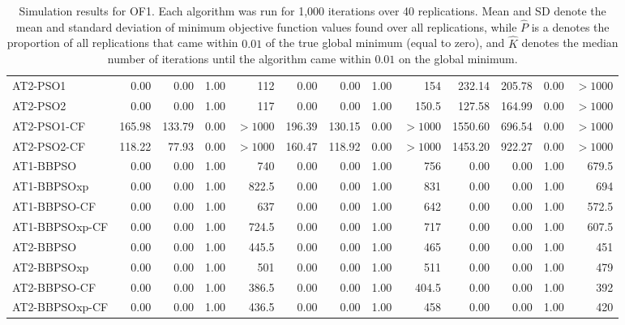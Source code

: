 \documentclass[cmbright]{staauth}
\numberwithin{table}{section}
\begin{document}
\begin{table}[ht]
\begin{tabular}{l|rrrr|rrrr|rrrr}
   \hline
AT2-PSO1 & 0.00 & 0.00 & 1.00 & 112 & 0.00 & 0.00 & 1.00 & 154 & 232.14 & 205.78 & 0.00 & $> 1000$ \\
  AT2-PSO2 & 0.00 & 0.00 & 1.00 & 117 & 0.00 & 0.00 & 1.00 & 150.5 & 127.58 & 164.99 & 0.00 & $> 1000$ \\
  AT2-PSO1-CF & 165.98 & 133.79 & 0.00 & $> 1000$ & 196.39 & 130.15 & 0.00 & $> 1000$ & 1550.60 & 696.54 & 0.00 & $> 1000$ \\
  AT2-PSO2-CF & 118.22 & 77.93 & 0.00 & $> 1000$ & 160.47 & 118.92 & 0.00 & $> 1000$ & 1453.20 & 922.27 & 0.00 & $> 1000$ \\
   \hline
AT1-BBPSO & 0.00 & 0.00 & 1.00 & 740 & 0.00 & 0.00 & 1.00 & 756 & 0.00 & 0.00 & 1.00 & 679.5 \\
  AT1-BBPSOxp & 0.00 & 0.00 & 1.00 & 822.5 & 0.00 & 0.00 & 1.00 & 831 & 0.00 & 0.00 & 1.00 & 694 \\
  AT1-BBPSO-CF & 0.00 & 0.00 & 1.00 & 637 & 0.00 & 0.00 & 1.00 & 642 & 0.00 & 0.00 & 1.00 & 572.5 \\
  AT1-BBPSOxp-CF & 0.00 & 0.00 & 1.00 & 724.5 & 0.00 & 0.00 & 1.00 & 717 & 0.00 & 0.00 & 1.00 & 607.5 \\
   \hline
AT2-BBPSO & 0.00 & 0.00 & 1.00 & 445.5 & 0.00 & 0.00 & 1.00 & 465 & 0.00 & 0.00 & 1.00 & 451 \\
  AT2-BBPSOxp & 0.00 & 0.00 & 1.00 & 501 & 0.00 & 0.00 & 1.00 & 511 & 0.00 & 0.00 & 1.00 & 479 \\
  AT2-BBPSO-CF & 0.00 & 0.00 & 1.00 & 386.5 & 0.00 & 0.00 & 1.00 & 404.5 & 0.00 & 0.00 & 1.00 & 392 \\
  AT2-BBPSOxp-CF & 0.00 & 0.00 & 1.00 & 436.5 & 0.00 & 0.00 & 1.00 & 458 & 0.00 & 0.00 & 1.00 & 420 \\
   \hline
\end{tabular}
\endgroup
\caption{Simulation results for OF1. Each algorithm was run for 1,000 iterations over 40 replications. Mean and SD denote the mean and standard deviation of minimum objective function values found over all replications, while $\widehat{P}$ is a denotes the proportion of all replications that came within $0.01$ of the true global minimum (equal to zero), and $\widehat{K}$ denotes the median number of iterations until the algorithm came within $0.01$ on the global minimum.}
\label{tab:psosim1}
\end{table}
\end{document}
